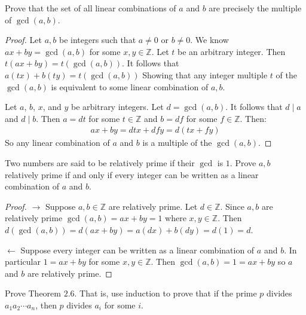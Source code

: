 \begin{tcolorbox}[title=Problem 3, breakable]
    Prove that the set of all linear combinations of $a$ and $b$
    are precisely the multiple of $\gcd(a, b)$.
\end{tcolorbox}

\begin{proof}
    Let $a, b$ be integers such that $a \not = 0$ or $b \not = 0$.
    We know $ax + by = \gcd(a, b)$ for some $x, y \in \mathbb{Z}$.
    Let $t$ be an arbitrary integer.
    Then $t(ax + by) = t(\gcd(a, b))$.
    It follows that $a(tx) + b(ty) = t(\gcd(a, b))$
    Showing that any integer multiple $t$ of the $\gcd(a, b)$
    is equivalent to some linear combination of $a, b$.

    Let $a$, $b$, $x$, and $y$ be arbitrary integers.
    Let $d = \gcd(a, b)$. It follows that $d \mid a$ and $d \mid b$.
    Then $a = dt$ for some $t \in \mathbb{Z}$ and $b = df$ for some $f \in \mathbb{Z}$.
    Then:
    \begin{align*}
        ax + by = dtx  + dfy = d(tx + fy)
    \end{align*}
    So any linear combination of $a$ and $b$ is a multiple of the $\gcd(a, b)$.
\end{proof}

\begin{tcolorbox}[title=Problem 4, breakable]
    Two numbers are said to be relatively prime if their $\gcd$ is $1$.
    Prove $a, b$ relatively prime if and only if every integer can be written
    as a linear combination of $a$ and $b$.
\end{tcolorbox}

\begin{proof}
    $\rightarrow$ Suppose $a, b \in \mathbb{Z}$ are relatively prime.
    Let $d \in \mathbb{Z}$. Since $a, b$ are relatively prime $\gcd(a, b) = ax + by = 1$ where $x, y \in \mathbb{Z}$.
    Then $d(\gcd(a, b)) = d(ax + by) = a(dx) + b(dy) = d(1) = d$.

    $\leftarrow$ Suppose every integer can be written as a linear combination of $a$ and $b$.
    In particular $1 = ax + by$ for some $x, y \in \mathbb{Z}$.
    Then $\gcd(a, b) = 1 = ax + by$ so $a$ and $b$ are relatively prime.
\end{proof}

\begin{tcolorbox}[title=Problem 5, breakable]
    Prove Theorem $2.6$. That is, use induction to prove that if the 
    prime $p$ divides $a_1 a_2 \cdots a_n$, then $p$ divides $a_i$ for some $i$.
\end{tcolorbox}

